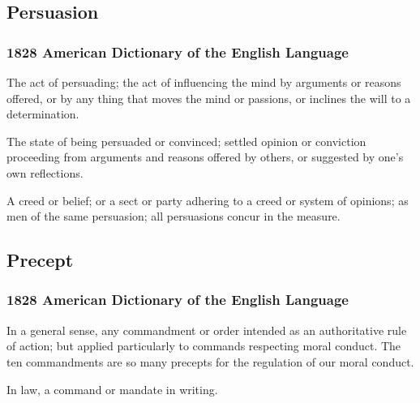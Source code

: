 	\subsection{Persuasion} %
		\label{PERSUASION}
		
		\subsubsection{1828 American Dictionary of the English Language}
		
			\begin{compactitem}
				\item[1] The act of persuading; the act of influencing the mind by arguments or reasons offered, or by any thing that moves the mind or passions, or inclines the will to a determination.
				\item[2] The state of being persuaded or convinced; settled opinion or conviction proceeding from arguments and reasons offered by others, or suggested by one's own reflections.
				\item[3] A creed or belief; or a sect or party adhering to a creed or system of opinions; as men of the same persuasion; all persuasions concur in the measure.
			\end{compactitem}

	\subsection{Precept} %
		\label{PRECEPT}
		
		\subsubsection{1828 American Dictionary of the English Language}
		
			\begin{compactitem}
				\item[1] In a general sense, any commandment or order intended as an authoritative rule of action; but applied particularly to commands respecting moral conduct. The ten commandments are so many precepts for the regulation of our moral conduct.
				\item[2] In law, a command or mandate in writing.
			\end{compactitem}
			
